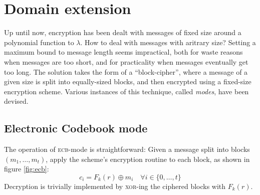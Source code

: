 
\section{Domain extension}

Up until now, encryption has been dealt with messages of fixed size around a polynomial function to $\lambda$. How to deal with messages with aritrary size? Setting a maximum bound to message length seems impractical, both for waste reasons when messages are too short, and for practicality when messages eventually get too long. The solution takes the form of a ``block-cipher'', where a message of a given size is split into equally-sized blocks, and then encrypted using a fixed-size encryption scheme. Various instances of this technique, called \emph{modes}, have been devised.

\subsection{Electronic Codebook mode}

The operation of \textsc{ecb}-mode is straightforward: Given a message split into blocks $(m_1, \dots, m_t)$, apply the scheme's encryption routine to each block, as shown in figure \ref{fig:ecb}:
\[
    c_i = F_k(r) \oplus m_i \quad \forall i \in \{0, \dots, t\}
\]
Decryption is trivially implemented by \textsc{xor}-ing the ciphered blocks with $F_k(r)$.


